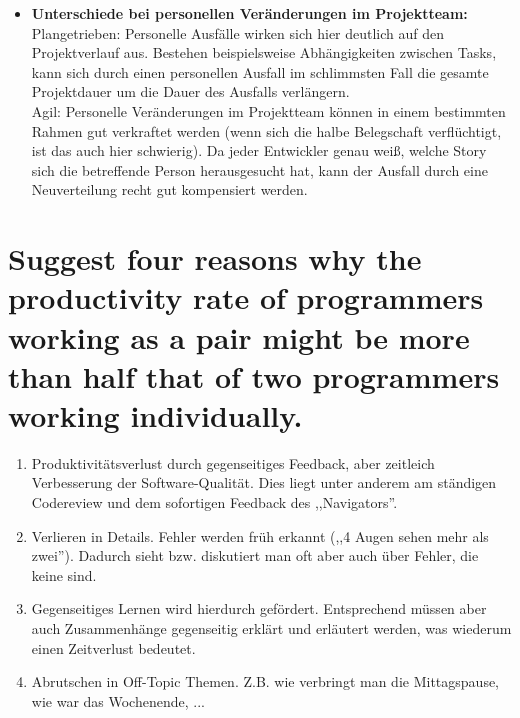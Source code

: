 \documentclass[a4paper,10pt]{article}
\begin{document}
\begin{itemize}
 \item[] \textbf{Unterschiede bei personellen Veränderungen im Projektteam:}
  \smallskip \\
 Plangetrieben: Personelle Ausfälle wirken sich hier deutlich auf den Projektverlauf aus. Bestehen beispielsweise Abhängigkeiten zwischen Tasks, kann sich durch einen personellen Ausfall im schlimmsten Fall die gesamte Projektdauer um die Dauer des Ausfalls verlängern.
 \smallskip \\
 Agil: Personelle Veränderungen im Projektteam können in einem bestimmten Rahmen gut verkraftet werden (wenn sich die halbe Belegschaft verflüchtigt, ist das auch hier schwierig). Da jeder Entwickler genau weiß, welche Story sich die betreffende Person herausgesucht hat, kann der Ausfall durch eine Neuverteilung recht gut kompensiert werden.
 
\end{itemize}



\section*{Suggest four reasons why the productivity rate of programmers working as a pair might be
more than half that of two programmers working individually.}
\begin{enumerate}
 \item Produktivitätsverlust durch gegenseitiges Feedback, aber zeitleich Verbesserung der Software-Qualität. Dies liegt unter anderem am ständigen Codereview und dem sofortigen Feedback des ,,Navigators''. 
 \item Verlieren in Details. Fehler werden früh erkannt (,,4 Augen sehen mehr als zwei''). Dadurch sieht bzw. diskutiert man oft aber auch über Fehler, die keine sind.
 \item Gegenseitiges Lernen wird hierdurch gefördert. Entsprechend müssen aber auch Zusammenhänge gegenseitig erklärt und erläutert werden, was wiederum einen Zeitverlust bedeutet.
 \item Abrutschen in Off-Topic Themen. Z.B. wie verbringt man die Mittagspause, wie war das Wochenende, ...
\end{enumerate}
\end{document}
